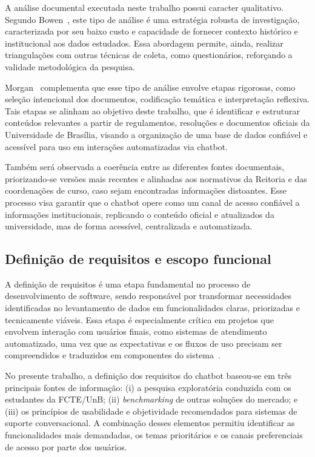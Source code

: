 A análise documental executada neste trabalho possui caracter qualitativo. Segundo Bowen~\cite{bowen2009}, este tipo de análise é uma estratégia robusta de investigação, caracterizada por seu baixo custo e capacidade de fornecer contexto histórico e institucional aos dados estudados. Essa abordagem permite, ainda, realizar triangulações com outras técnicas de coleta, como questionários, reforçando a validade metodológica da pesquisa.

Morgan~\cite{morgan2022} complementa que esse tipo de análise envolve etapas rigorosas, como seleção intencional dos documentos, codificação temática e interpretação reflexiva. Tais etapas se alinham ao objetivo deste trabalho, que é identificar e estruturar conteúdos relevantes a partir de regulamentos, resoluções e documentos oficiais da Universidade de Brasília, visando a organização de uma base de dados confiável e acessível para uso em interações automatizadas via chatbot.

Também será observada a coerência entre as diferentes fontes documentais, priorizando-se versões mais recentes e alinhadas aos normativos da Reitoria e das coordenações de curso, caso sejam encontradas informações distoantes. Esse processo visa garantir que o chatbot opere como um canal de acesso confiável a informações institucionais, replicando o conteúdo oficial e atualizados da universidade, mas de forma acessível, centralizada e automatizada.

\subsection{Definição de requisitos e escopo funcional}

A definição de requisitos é uma etapa fundamental no processo de desenvolvimento de software, sendo responsável por transformar necessidades identificadas no levantamento de dados em funcionalidades claras, priorizadas e tecnicamente viáveis. Essa etapa é especialmente crítica em projetos que envolvem interação com usuários finais, como sistemas de atendimento automatizado, uma vez que as expectativas e os fluxos de uso precisam ser compreendidos e traduzidos em componentes do sistema~\cite{pressman2016engenharia, sommerville2011}.

No presente trabalho, a definição dos requisitos do chatbot baseou-se em três principais fontes de informação: (i) a pesquisa exploratória conduzida com os estudantes da FCTE/UnB; (ii) \textit{benchmarking} de outras soluções do mercado; e (iii) os princípios de usabilidade e objetividade recomendados para sistemas de suporte conversacional. A combinação desses elementos permitiu identificar as funcionalidades mais demandadas, os temas prioritários e os canais preferenciais de acesso por parte dos usuários.

